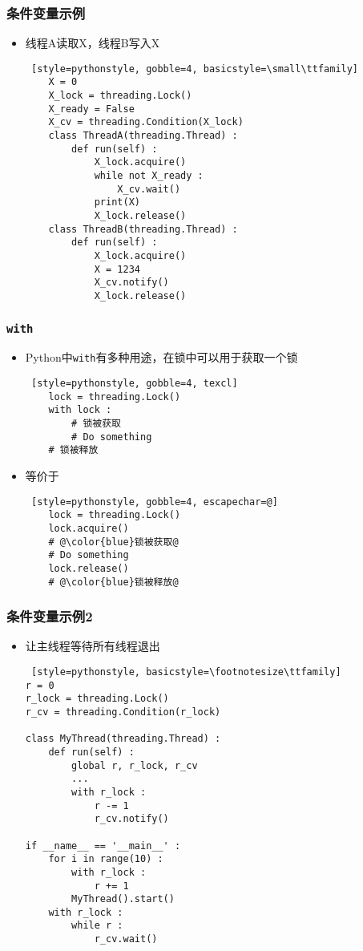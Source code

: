 \begin{frame} [fragile]
	\frametitle{条件变量示例}
	\begin{itemize}
	\item 线程A读取X，线程B写入X
	\begin{lstlisting} [style=pythonstyle, gobble=4, basicstyle=\small\ttfamily]
	X = 0
	X_lock = threading.Lock()
	X_ready = False
	X_cv = threading.Condition(X_lock)
	class ThreadA(threading.Thread) :
		def run(self) :
			X_lock.acquire()
			while not X_ready :
				X_cv.wait()
			print(X)
			X_lock.release()
	class ThreadB(threading.Thread) :
		def run(self) :
			X_lock.acquire()
			X = 1234
			X_cv.notify()
			X_lock.release()
	\end{lstlisting}
	\end{itemize}
\end{frame}

\begin{frame} [fragile]
	\frametitle{\texttt{with}}
	\begin{itemize}
	\item Python中\texttt{with}有多种用途，在锁中可以用于获取一个锁
	\begin{lstlisting} [style=pythonstyle, gobble=4, texcl]
	lock = threading.Lock()
	with lock :
		# 锁被获取
		# Do something
	# 锁被释放
	\end{lstlisting}
	\item 等价于
	\begin{lstlisting} [style=pythonstyle, gobble=4, escapechar=@]
	lock = threading.Lock()
	lock.acquire()
	# @\color{blue}锁被获取@
	# Do something
	lock.release()
	# @\color{blue}锁被释放@
	\end{lstlisting}
	\end{itemize}
\end{frame}

\begin{frame} [fragile]
	\frametitle{条件变量示例2}
	\linespread{0.8}
	\begin{itemize}
	\item 让主线程等待所有线程退出
	\begin{lstlisting} [style=pythonstyle, basicstyle=\footnotesize\ttfamily]
r = 0
r_lock = threading.Lock()
r_cv = threading.Condition(r_lock)

class MyThread(threading.Thread) :
	def run(self) :
		global r, r_lock, r_cv
		...
		with r_lock :
			r -= 1
			r_cv.notify()

if __name__ == '__main__' :
	for i in range(10) :
		with r_lock :
			r += 1
		MyThread().start()
	with r_lock :
		while r :
			r_cv.wait()
	\end{lstlisting}
	\end{itemize}
\end{frame}

